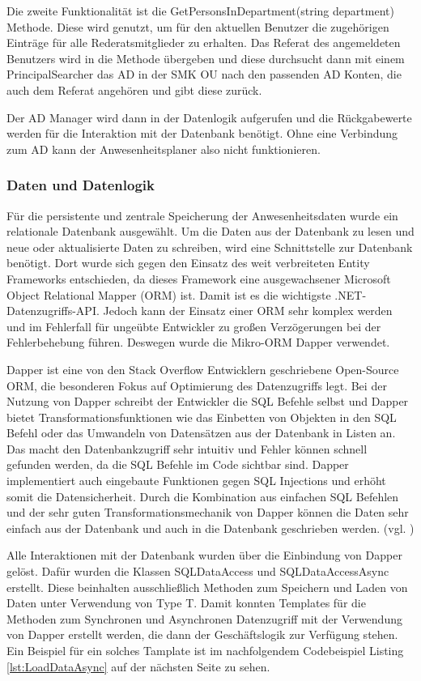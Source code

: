Die zweite Funktionalität ist die GetPersonsInDepartment(string department) Methode. Diese wird genutzt, um für den aktuellen Benutzer die zugehörigen Einträge für alle Rederatsmitglieder zu erhalten. Das Referat des angemeldeten Benutzers wird in die Methode übergeben und diese durchsucht dann mit einem PrincipalSearcher das AD in der SMK OU nach den passenden AD Konten, die auch dem Referat angehören und gibt diese zurück.

Der AD Manager wird dann in der Datenlogik aufgerufen und die Rückgabewerte werden für die Interaktion mit der Datenbank benötigt. Ohne eine Verbindung zum AD kann der Anwesenheitsplaner also nicht funktionieren.

\subsubsection{Daten und Datenlogik}
\label{sec:Daten}
Für die persistente und zentrale Speicherung der Anwesenheitsdaten wurde ein relationale Datenbank ausgewählt. Um die Daten aus der Datenbank zu lesen und neue oder aktualisierte Daten zu schreiben, wird eine Schnittstelle zur Datenbank benötigt. Dort wurde sich gegen den Einsatz des weit verbreiteten Entity Frameworks entschieden, da dieses Framework eine ausgewachsener Microsoft Object Relational Mapper (ORM) ist. Damit ist es die wichtigste .NET-Datenzugriffs-API. Jedoch kann der Einsatz einer ORM sehr komplex werden und im Fehlerfall für ungeübte Entwickler zu großen Verzögerungen bei der Fehlerbehebung führen. Deswegen wurde die Mikro-ORM Dapper verwendet.

Dapper ist eine von den Stack Overflow Entwicklern geschriebene Open-Source ORM, die besonderen Fokus auf Optimierung des Datenzugriffs legt. Bei der Nutzung von Dapper schreibt der Entwickler die SQL Befehle selbst und Dapper bietet Transformationsfunktionen wie \zB das Einbetten von Objekten in den SQL Befehl oder das Umwandeln von Datensätzen aus der Datenbank in Listen an. Das macht den Datenbankzugriff sehr intuitiv und Fehler können schnell gefunden werden, da die SQL Befehle im Code sichtbar sind. Dapper implementiert auch eingebaute Funktionen gegen SQL Injections und erhöht somit die Datensicherheit. Durch die Kombination aus einfachen SQL Befehlen und der sehr guten Transformationsmechanik von Dapper können die Daten sehr einfach aus der Datenbank und auch in die Datenbank geschrieben werden. (vgl. \cite{Dapper})

Alle Interaktionen mit der Datenbank wurden über die Einbindung von Dapper gelöst. Dafür wurden die Klassen SQLDataAccess und SQLDataAccessAsync erstellt. Diese beinhalten ausschließlich Methoden zum Speichern und Laden von Daten unter Verwendung von Type T. Damit konnten Templates für die Methoden zum Synchronen und Asynchronen Datenzugriff mit der Verwendung von Dapper erstellt werden, die dann der Geschäftslogik zur Verfügung stehen. Ein Beispiel für ein solches Tamplate ist im nachfolgendem Codebeispiel Listing \ref{lst:LoadDataAsync} auf der nächsten Seite zu sehen.
\newpage

